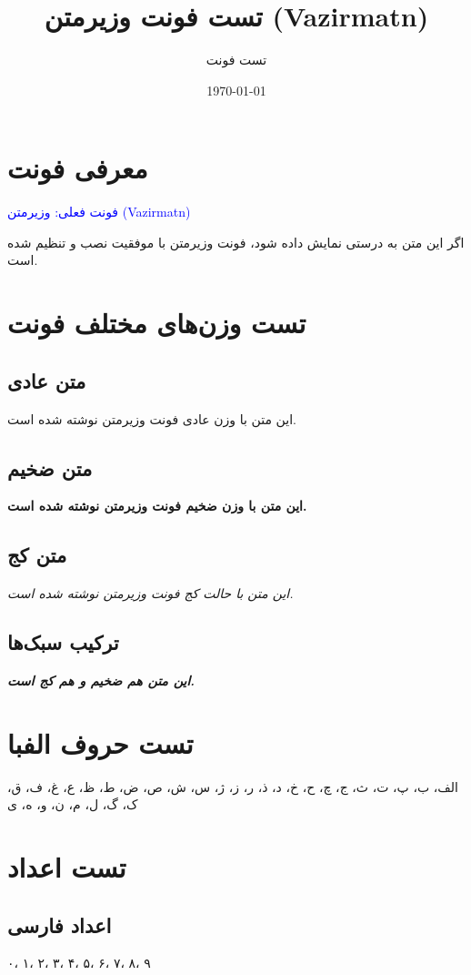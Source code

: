 \documentclass[12pt,a4paper]{article}
\title{تست فونت وزیرمتن (Vazirmatn)}
\author{تست فونت}
\date{\today}
\begin{document}
\maketitle

\section{معرفی فونت}
\textcolor{blue}{فونت فعلی: وزیرمتن (Vazirmatn)}

اگر این متن به درستی نمایش داده شود، فونت وزیرمتن با موفقیت نصب و تنظیم شده است.

\section{تست وزن‌های مختلف فونت}

\subsection{متن عادی}
این متن با وزن عادی فونت وزیرمتن نوشته شده است.

\subsection{متن ضخیم}
\textbf{این متن با وزن ضخیم فونت وزیرمتن نوشته شده است.}

\subsection{متن کج}
\textit{این متن با حالت کج فونت وزیرمتن نوشته شده است.}

\subsection{ترکیب سبک‌ها}
\textbf{\textit{این متن هم ضخیم و هم کج است.}}

\section{تست حروف الفبا}
الف، ب، پ، ت، ث، ج، چ، ح، خ، د، ذ، ر، ز، ژ، س، ش، ص، ض، ط، ظ، ع، غ، ف، ق، ک، گ، ل، م، ن، و، ه، ی

\section{تست اعداد}

\subsection{اعداد فارسی}
۰، ۱، ۲، ۳، ۴، ۵، ۶، ۷، ۸، ۹
\end{document}
